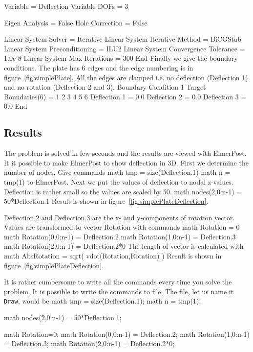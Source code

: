   Variable = Deflection
  Variable DOFs = 3

  Eigen Analysis = False
  Hole Correction = False

  Linear System Solver = Iterative
  Linear System Iterative Method = BiCGStab
  Linear System Preconditioning = ILU2
  Linear System Convergence Tolerance = 1.0e-8
  Linear System Max Iterations = 300
End
\ttend
Finally we give the boundary conditions. The plate has 6 edges and
the edge numbering is in figure~\ref{fig:simplePlate}. All the edges are
clamped i.e. no deflection (Deflection 1) and  no rotation (Deflection 2 and 3).
\ttbegin
Boundary Condition 1
  Target Boundaries(6) = 1 2 3 4 5 6
  Deflection 1 = 0.0
  Deflection 2 = 0.0
  Deflection 3 = 0.0
End
\ttend

\subsection*{Results}

The problem is solved in few seconds and the results are viewed with
ElmerPost. It it possible to make ElmerPost to show deflection
in 3D. First we determine the number of nodes. Give commands
\ttbegin
math tmp = size(Deflection.1)
math n = tmp(1)
\ttend
to ElmerPost. Next we put the values of deflection to nodal z-values.
Deflection is rather small so the values are scaled by 50.
\ttbegin
math nodes(2,0:n-1) = 50*Deflection.1
\ttend
Result is shown in figure~\ref{fig:simplePlateDeflection}.

Deflection.2 and Deflection.3 are the x- and y-components of rotation vector.
Values are transformed to vector Rotation with commands
\ttbegin
math Rotation = 0
math Rotation(0,0:n-1) = Deflection.2
math Rotation(1,0:n-1) = Deflection.3
math Rotation(2,0:n-1) = Deflection.2*0
\ttend
The length of vector is calculated with
\ttbegin
math AbsRotation = sqrt( vdot(Rotation,Rotation) )
\ttend
Result is shown in figure~\ref{fig:simplePlateDeflection}.

It is rather cumbersome to write all the commands every time
you solve the problem. It is possible to write the commands
to file. The file, let us name it \texttt{Draw}, would be
\ttbegin
math tmp = size(Deflection.1);
math n = tmp(1);

math nodes(2,0:n-1) = 50*Deflection.1;

math Rotation=0;
math Rotation(0,0:n-1) = Deflection.2;
math Rotation(1,0:n-1) = Deflection.3;
math Rotation(2,0:n-1) = Deflection.2*0;

